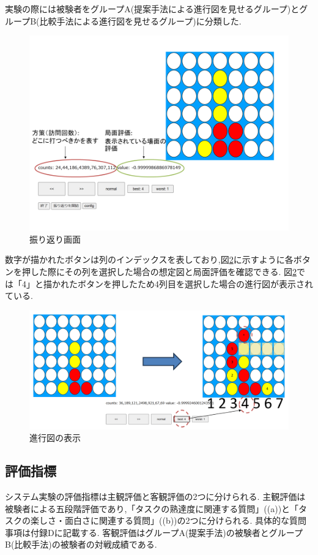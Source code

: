 実験の際には被験者をグループA(提案手法による進行図を見せるグループ)とグループB(比較手法による進行図を見せるグループ)に分類した.
\begin{figure}[t]
	\centering
	\includegraphics[width=\linewidth]{./figure/lookBack.png}
	\caption{振り返り画面}
	\label{fig:lookBack}
\end{figure}
数字が描かれたボタンは列のインデックスを表しており,図\ref{fig:trajSystem}に示すように各ボタンを押した際にその列を選択した場合の想定図と局面評価を確認できる.
図\ref{fig:trajSystem}では「4」と描かれたボタンを押したため4列目を選択した場合の進行図が表示されている.
\begin{figure}[t]
    \centering
    \includegraphics[width=\linewidth]{./figure/4-traj.png}
	\caption{進行図の表示}
	\label{fig:trajSystem}
\end{figure}
\subsection{評価指標}
システム実験の評価指標は主観評価と客観評価の2つに分けられる.
主観評価は被験者による五段階評価であり,「タスクの熟達度に関連する質問」((a))と「タスクの楽しさ・面白さに関連する質問」((b))の2つに分けられる.
具体的な質問事項は付録Dに記載する.
客観評価はグループA(提案手法)の被験者とグループB(比較手法)の被験者の対戦成績である.

